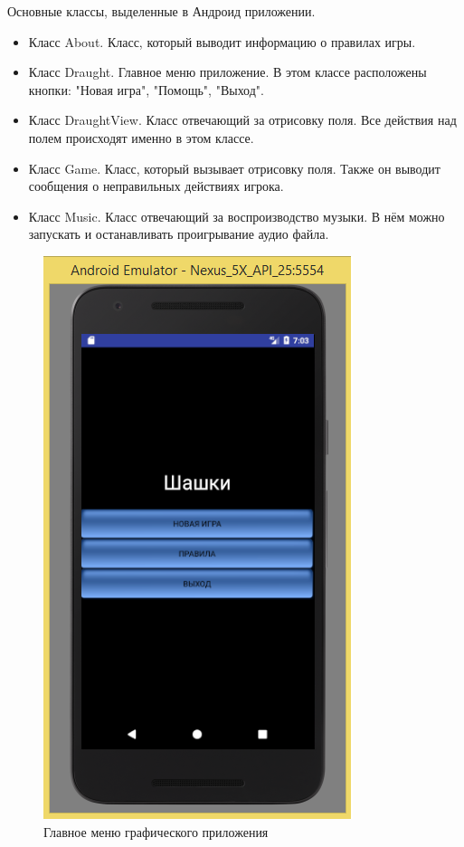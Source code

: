 \documentclass[a4paper]{article}
\begin{document}
\noindent Основные классы, выделенные в Андроид приложении. 
\begin{itemize}
\item Класс About. Класс, который выводит информацию о правилах игры.
\item Класс Draught. Главное меню приложение. В этом классе расположены кнопки: "Новая игра", "Помощь", "Выход".
\item Класс DraughtView. Класс отвечающий за отрисовку поля. Все действия над полем происходят именно в этом классе.
\item Класс Game. Класс, который вызывает отрисовку поля. Также он выводит сообщения о неправильных действиях игрока.
\item Класс Music. Класс отвечающий за воспроизводство музыки. В нём можно запускать и останавливать проигрывание аудио файла.
\end{itemize}

\begin{figure}[H]
	\begin{center}
		\includegraphics[scale=0.5]{menu}
		\caption{Главное меню графического приложения} 
		\label{pic:menu} %
	\end{center}
\end{figure}
\end{document}
